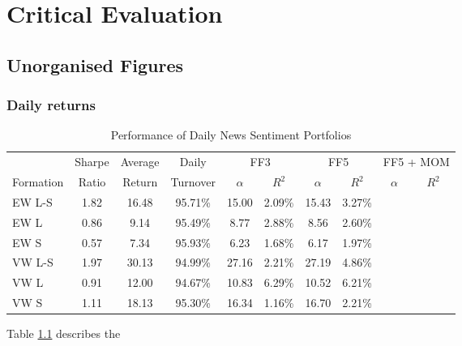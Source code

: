 \documentclass[ oneside,%
                    author={Joshua Felmeden},
                    degree={MEng},
                     title={Semantic Analysis of Financial Headlines Based on Realised Stock Returns},
                  subtitle={}]{dissertation}
\begin{document}

\chapter{Critical Evaluation}
\label{chap:evaluation}

\section{Unorganised Figures}

\subsection{Daily returns}


\begin{table}[!ht]
\begin{center}
\begin{tabular}{lccccccccc}
      \toprule
      & Sharpe &  Average & Daily & \multicolumn{2}{c}{FF3} & \multicolumn{2}{c}{FF5} & \multicolumn{2}{c}{FF5 + MOM} \\
      \cmidrule(lr){5-6}
      \cmidrule(lr){7-8}
      \cmidrule(lr){9-10}
      Formation & Ratio & Return & Turnover & $\alpha$ & $R^2$ & $\alpha$ & $R^2$ & $\alpha$ & $R^2$ \\
      \midrule
      EW L-S& 1.82 & 16.48& 95.71\% & 15.00& 2.09\% & 15.43 & 3.27\% \\
      EW L  & 0.86 & 9.14 & 95.49\% & 8.77 & 2.88\% & 8.56 & 2.60\% \\
      EW S  & 0.57 & 7.34 & 95.93\% & 6.23 & 1.68\% & 6.17 & 1.97\% \\
      VW L-S& 1.97 & 30.13& 94.99\% & 27.16& 2.21\% & 27.19 & 4.86\% \\
      VW L  & 0.91 & 12.00& 94.67\% & 10.83& 6.29\% & 10.52 & 6.21\% \\
      VW S  & 1.11 & 18.13& 95.30\% & 16.34& 1.16\% & 16.70 & 2.21\%\\
      \bottomrule
\end{tabular}
\caption{Performance of Daily News Sentiment Portfolios}
\label{portfolio-performance}
\end{center}
\end{table}

Table \ref{portfolio-performance} describes the 

\end{document}
